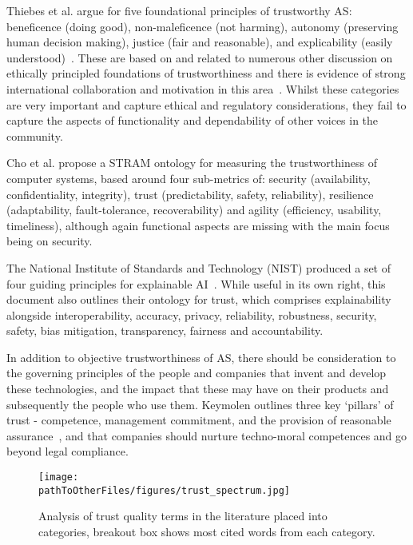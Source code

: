 Thiebes et al. argue for five foundational principles of trustworthy AS: beneficence (doing good), non-maleficence (not harming), autonomy (preserving human decision making), justice (fair and reasonable), and explicability (easily understood)~\cite{Thiebes2021}. These are based on and related to numerous other discussion on ethically principled foundations of trustworthiness and there is evidence of strong international collaboration and motivation in this area~\cite{Floridi2018,jobin2019global}. Whilst these categories are very important and capture ethical and regulatory considerations, they fail to capture the aspects of functionality and dependability of other voices in the community.

Cho et al. propose a STRAM ontology for measuring the trustworthiness of computer systems, based around four sub-metrics of: security (availability, confidentiality, integrity), trust (predictability, safety, reliability), resilience (adaptability, fault-tolerance, recoverability) and agility (efficiency, usability, timeliness), although again functional aspects are missing with the main focus being on security.

The National Institute of Standards and Technology (NIST) produced a set of four guiding principles for explainable AI~\cite{nist4}. While useful in its own right, this document also outlines their ontology for trust, which comprises explainability alongside interoperability, accuracy, privacy, reliability, robustness, security, safety, bias mitigation, transparency, fairness and accountability. 

In addition to objective trustworthiness of AS, there should be consideration to the governing principles of the people and companies that invent and develop these technologies, and the impact that these may have on their products and subsequently the people who use them. Keymolen outlines three key `pillars' of trust - competence, management commitment, and the provision of reasonable assurance~\cite{keymolen}, and that companies should nurture techno-moral competences and go beyond legal compliance.  


\begin{figure*}[]
    \centering
    \texttt{[image: \\pathToOtherFiles/figures/trust\_spectrum.jpg]}
    \caption{Analysis of trust quality terms in the literature placed into categories, breakout box shows most cited words from each category.}
    \label{fig:trust_spectrum}
\end{figure*}

